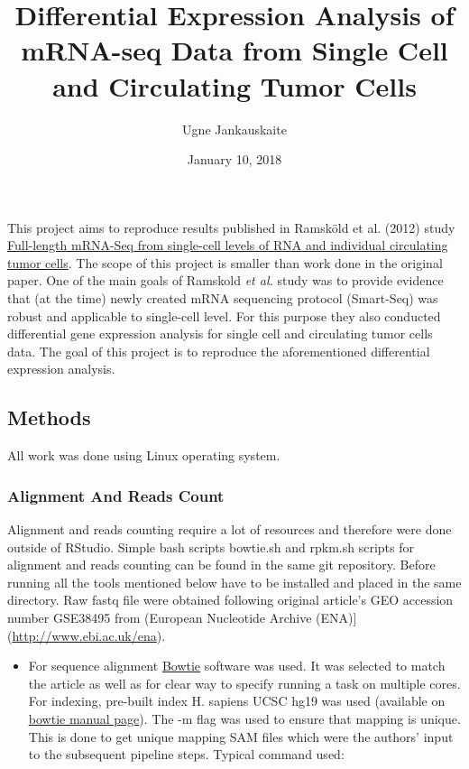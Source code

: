 \documentclass[]{article}
\title{Differential Expression Analysis of mRNA-seq Data from Single Cell and
Circulating Tumor Cells}
\author{Ugne Jankauskaite}
\date{January 10, 2018}
\providecommand{\tightlist}{%
  \setlength{\itemsep}{0pt}\setlength{\parskip}{0pt}}
\begin{document}
\maketitle

This project aims to reproduce results published in Ramsköld et al.
(2012) study \href{https://www.nature.com/articles/nbt.2282}{Full-length
mRNA-Seq from single-cell levels of RNA and individual circulating tumor
cells}. The scope of this project is smaller than work done in the
original paper. One of the main goals of Ramskold \emph{et al.} study
was to provide evidence that (at the time) newly created mRNA sequencing
protocol (Smart-Seq) was robust and applicable to single-cell level. For
this purpose they also conducted differential gene expression analysis
for single cell and circulating tumor cells data. The goal of this
project is to reproduce the aforementioned differential expression
analysis.

\subsection{Methods}\label{methods}

All work was done using Linux operating system.

\subsubsection{Alignment And Reads
Count}\label{alignment-and-reads-count}

Alignment and reads counting require a lot of resources and therefore
were done outside of RStudio. Simple bash scripts bowtie.sh and rpkm.sh
scripts for alignment and reads counting can be found in the same git
repository. Before running all the tools mentioned below have to be
installed and placed in the same directory. Raw fastq file were obtained
following original article's GEO accession number GSE38495 from
(European Nucleotide Archive (ENA){]}(\url{http://www.ebi.ac.uk/ena}).

\begin{itemize}
\tightlist
\item
  For sequence alignment
  \href{http://bowtie-bio.sourceforge.net/index.shtml}{Bowtie} software
  was used. It was selected to match the article as well as for clear
  way to specify running a task on multiple cores. For indexing,
  pre-built index H. sapiens UCSC hg19 was used (available on
  \href{http://bowtie-bio.sourceforge.net/manual.shtml}{bowtie manual
  page}). The -m flag was used to ensure that mapping is unique. This is
  done to get unique mapping SAM files which were the authors' input to
  the subsequent pipeline steps. Typical command used:
\end{itemize}
\end{document}
